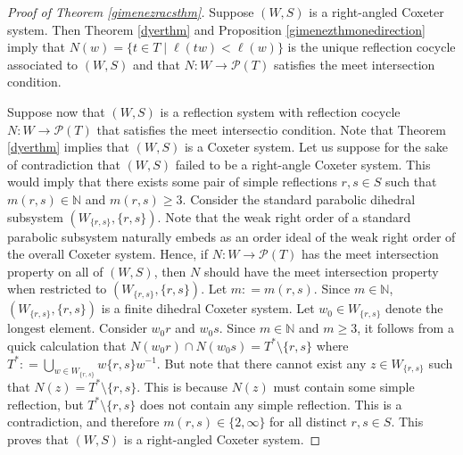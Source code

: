\documentclass{amsart}
\theoremstyle{plain} %
\theoremstyle{definition}
\def\N{\mathbb{N}}
\begin{document}
\begin{proof}[Proof of Theorem \ref{gimenezracsthm}]
    Suppose $ (W,S)$ is a right-angled Coxeter system. Then Theorem \ref{dyerthm} and Proposition \ref{gimenezthmonedirection} imply that $ N(w) = \{ t\in T \mid \ell(tw) < \ell(w)  \}$ is the unique reflection cocycle associated to $ (W,S)$ and that $ N: W \rightarrow \mathcal{P}(T)$ satisfies the meet intersection condition.

    Suppose now that $ (W,S)$ is a reflection system with reflection cocycle $ N:W \rightarrow \mathcal{P}(T)$ that satisfies the meet intersectio condition. Note that Theorem \ref{dyerthm} implies that $ (W,S)$ is a Coxeter system. Let us suppose for the sake of contradiction that $ (W,S)$ failed to be a right-angle Coxeter system. This would imply that there exists some pair of simple reflections $ r,s\in S$ such that $ m(r,s) \in \N$ and $ m(r,s) \geq 3$. Consider the standard parabolic dihedral subsystem $ (W_{\{ r,s \} }, \{  r,s\})$. Note that the weak right order of a standard parabolic subsystem naturally embeds as an order ideal of the weak right order of the overall Coxeter system. Hence, if $ N: W\rightarrow \mathcal{P}(T)$ has the meet intersection property on all of $ (W,S)$, then $N$ should have the meet intersection property when restricted to $ (W_{\{ r,s \} } , \{ r,s \})$. Let $ m: = m(r,s)$. Since $ m\in \N$,  $ (W_{\{ r,s \} } , \{ r,s \})$ is a finite dihedral Coxeter system. Let $ w_{0}\in W_{\{ r,s \} }$ denote the longest element. Consider $ w_{0}r$ and $ w_{0}s$. Since $m\in \N$ and $m\geq 3$, it follows from a quick calculation that $ N(w_{0}r) \cap N(w_{0}s) = T^{\ast} \setminus \{ r,s \}$ where $ T^{\ast} : = \bigcup_{w\in W_{\{ r,s \} }} w\{ r,s \}w^{-1}$. But note that there cannot exist any $z\in W_{\{ r,s \} }$ such that $ N(z) = T^{\ast} \setminus \{ r,s \}$. This is because $N(z)$ must contain some simple reflection, but $ T^{\ast} \setminus \{  r,s \}$ does not contain any simple reflection. This is a contradiction, and therefore $ m(r,s) \in \{  2,\infty \}$ for all distinct $ r,s\in S$. This proves that $ (W,S)$ is a right-angled Coxeter system. 
    
\end{proof}












\end{document}
